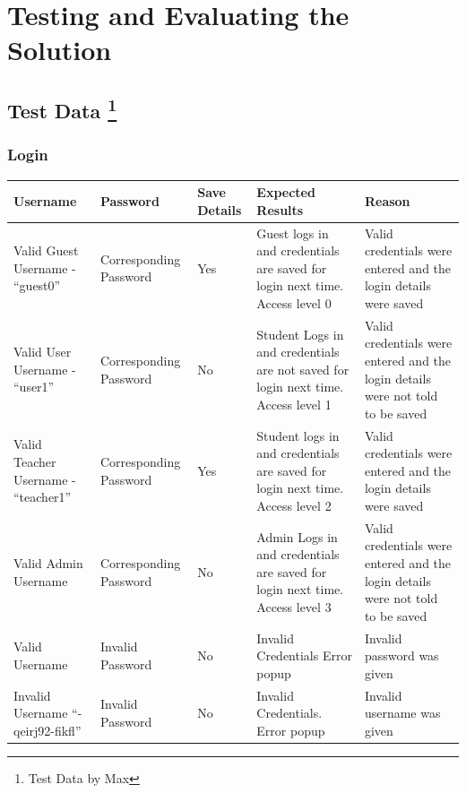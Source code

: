 \documentclass[oneside,openany,11pt,a4paper]{report}
\begin{document}
\chapter{Testing and Evaluating the Solution}
\section{Test Data \protect\footnote{Test Data by Max}}
\subsection{Login}

\begin{longtable}{|p{3cm}|p{3cm}|p{3cm}|p{3cm}|p{3cm}|}
	\hline
	\rowcolor{gray!50}
	\textbf{Username} & \textbf{Password} & \textbf{Save Details} & \textbf{Expected Results} & \textbf{Reason}\\ \hline
	Valid Guest Username - “guest0” & Corresponding Password & Yes & Guest logs in and credentials are saved for login next time. Access level 0 & Valid credentials were entered and the login details were saved \\ \hline
	
	Valid User Username - “user1” & Corresponding Password & No & Student Logs in and credentials are not saved for login next time. Access level 1 &  Valid credentials were entered and the login details were not told to be saved \\ \hline
	
Valid Teacher Username - “teacher1” & 	Corresponding Password & Yes & Student logs in and credentials are saved for login next time. Access level 2 & Valid credentials were entered and the login details were saved \\ \hline

Valid Admin Username & Corresponding Password & No & Admin Logs in and credentials are saved for login next time. Access level 3 & Valid credentials were entered and the login details were not told to be saved \\ \hline

Valid Username & Invalid Password & No & Invalid Credentials Error popup & Invalid password was given \\ \hline

Invalid Username “-qeirj92-fikfl” & Invalid Password & No & Invalid Credentials. Error popup & Invalid username was given \\ \hline
	
\end{longtable}
\end{document}
